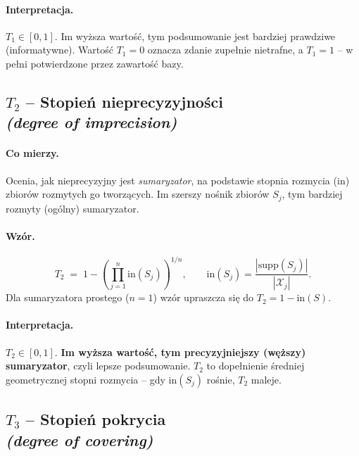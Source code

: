 \paragraph{Interpretacja.}
$T_1 \in [0, 1]$. Im wyższa wartość, tym podsumowanie jest bardziej
prawdziwe (informatywne). Wartość $T_1 = 0$ oznacza zdanie zupełnie
nietrafne, a $T_1 = 1$ -- w pełni potwierdzone przez zawartość bazy.

\subsection*{$T_2$ -- Stopień nieprecyzyjności \\
\textit{(degree of imprecision)}}

\paragraph{Co mierzy.}
Ocenia, jak nieprecyzyjny jest \emph{sumaryzator}, na podstawie
stopnia rozmycia ($\mathrm{in}$) zbiorów rozmytych go tworzących.
Im szerszy nośnik zbiorów $S_j$, tym bardziej rozmyty (ogólny)
sumaryzator.

\paragraph{Wzór.}
\begin{equation}
\label{eq:T2}
    T_2 \;=\; 1 - \left( \prod_{j=1}^{n} \mathrm{in}(S_j) \right)^{1/n},
    \qquad
    \mathrm{in}(S_j) = \frac{|\mathrm{supp}(S_j)|}{|\mathcal{X}_j|}.
\end{equation}
Dla sumaryzatora prostego ($n=1$) wzór upraszcza się do
$T_2 = 1 - \mathrm{in}(S)$.

\paragraph{Interpretacja.}
$T_2 \in [0, 1]$. \textbf{Im wyższa wartość, tym precyzyjniejszy
(węższy) sumaryzator}, czyli lepsze podsumowanie. $T_2$ to dopełnienie
średniej geometrycznej stopni rozmycia -- gdy $\mathrm{in}(S_j)$
rośnie, $T_2$ maleje.

\subsection*{$T_3$ -- Stopień pokrycia \\
\textit{(degree of covering)}}

